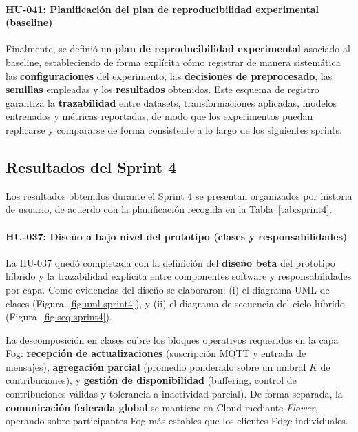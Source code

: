 \documentclass{report}
\begin{document}
\paragraph{HU-041: Planificación del plan de reproducibilidad experimental (baseline)}
Finalmente, se definió un \textbf{plan de reproducibilidad experimental} asociado al baseline, estableciendo de forma explícita cómo registrar de manera sistemática las \textbf{configuraciones} del experimento, las \textbf{decisiones de preprocesado}, las \textbf{semillas} empleadas y los \textbf{resultados} obtenidos. Este esquema de registro garantiza la \textbf{trazabilidad} entre datasets, transformaciones aplicadas, modelos entrenados y métricas reportadas, de modo que los experimentos puedan replicarse y compararse de forma consistente a lo largo de los siguientes sprints.




\subsection{Resultados del Sprint 4}


Los resultados obtenidos durante el Sprint 4 se presentan organizados por historia de usuario, de acuerdo con la planificación recogida en la Tabla~\ref{tab:sprint4}.

\paragraph{HU-037: Diseño a bajo nivel del prototipo (clases y responsabilidades)}
La HU-037 quedó completada con la definición del \textbf{diseño beta} del prototipo híbrido y la trazabilidad explícita entre componentes software y responsabilidades por capa. Como evidencias del diseño se elaboraron:
(i) el diagrama UML de clases (Figura~\ref{fig:uml-sprint4}), y
(ii) el diagrama de secuencia del ciclo híbrido (Figura~\ref{fig:seq-sprint4}).

La descomposición en clases cubre los bloques operativos requeridos en la capa Fog:
\textbf{recepción de actualizaciones} (suscripción MQTT y entrada de mensajes),
\textbf{agregación parcial} (promedio ponderado sobre un umbral $K$ de contribuciones),
y \textbf{gestión de disponibilidad} (buffering, control de contribuciones válidas y tolerancia a inactividad parcial).
De forma separada, la \textbf{comunicación federada global} se mantiene en Cloud mediante \textit{Flower}, operando sobre participantes Fog más estables que los clientes Edge individuales.
\end{document}
